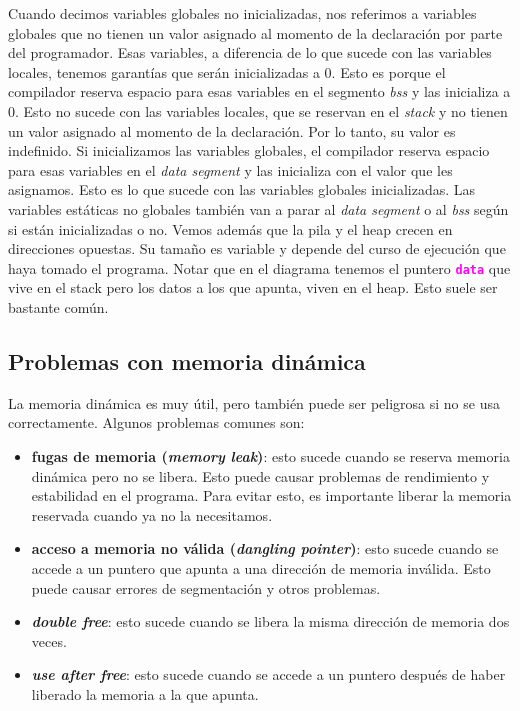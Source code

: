 \documentclass[]{scrartcl}
\newcommand{\hl}[1]{\textcolor{magenta}{\textbf{\texttt{#1}}}}
\begin{document}
Cuando decimos variables globales no inicializadas, nos referimos a variables globales que no tienen un valor asignado al momento de la declaración por parte del programador. Esas variables, a diferencia de lo que sucede con las variables locales, tenemos garantías que serán inicializadas a 0. Esto es porque el compilador reserva espacio para esas variables en el segmento \textit{bss} y las inicializa a 0. Esto no sucede con las variables locales, que se reservan en el \textit{stack} y no tienen un valor asignado al momento de la declaración. Por lo tanto, su valor es indefinido.
Si inicializamos las variables globales, el compilador reserva espacio para esas variables en el \textit{data segment} y las inicializa con el valor que les asignamos. Esto es lo que sucede con las variables globales inicializadas. Las variables estáticas no globales también van a parar al \textit{data segment} o al \textit{bss} según si están inicializadas o no. 
Vemos además que la pila y el heap crecen en direcciones opuestas. Su tamaño es variable y depende del curso de ejecución que haya tomado el programa. Notar que en el diagrama tenemos el puntero \hl{data} que vive en el stack pero los datos a los que apunta, viven en el heap. Esto suele ser bastante común.

\subsection*{Problemas con memoria dinámica}

La memoria dinámica es muy útil, pero también puede ser peligrosa si no se usa correctamente. Algunos problemas comunes son:
\begin{itemize}
  \item \textbf{fugas de memoria (\textit{memory leak})}: esto sucede cuando se reserva memoria dinámica pero no se libera. Esto puede causar problemas de rendimiento y estabilidad en el programa. Para evitar esto, es importante liberar la memoria reservada cuando ya no la necesitamos.
  \item \textbf{acceso a memoria no válida (\textit{dangling pointer})}: esto sucede cuando se accede a un puntero que apunta a una dirección de memoria inválida. Esto puede causar errores de segmentación y otros problemas. 
  \item \textbf{\textit{double free}}: esto sucede cuando se libera la misma dirección de memoria dos veces. 
  \item \textbf{\textit{use after free}}: esto sucede cuando se accede a un puntero después de haber liberado la memoria a la que apunta. 
\end{itemize}
\end{document}
